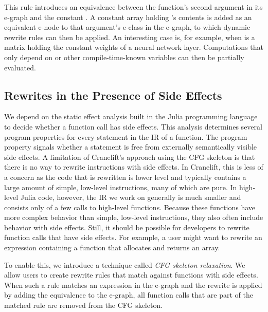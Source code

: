 This rule introduces an equivalence between the function's second argument in its e-graph and the constant . A constant array holding 's contents is added as an equivalent e-node to that argument's e-class in the e-graph, to which dynamic rewrite rules can then be applied. An interesting case is, for example, when  is a matrix holding the constant weights of a neural network layer.
Computations that only depend on  or other compile-time-known variables can then be partially evaluated.


\subsection{Rewrites in the Presence of Side Effects}
We depend on the static effect analysis built in the Julia programming language to decide whether a function call has side effects.
This analysis determines several program properties for every statement in the IR of a function.
The program property  signals whether a statement is free from externally semantically visible side effects.
A limitation of Cranelift's approach using the CFG skeleton is that there is no way to rewrite instructions with side effects.
In Cranelift, this is less of a concern as the code that is rewritten is lower level and typically contains a large amount of simple, low-level instructions, many of which are pure.
In high-level Julia code, however, the IR we work on generally is much smaller and consists only of a few calls to high-level functions.
Because these functions have more complex behavior than simple, low-level instructions, they also often include behavior with side effects. 
Still, it should be possible for developers to rewrite function calls that have side effects.
For example, a user might want to rewrite an expression containing a function that allocates and returns an array.

To enable this, we introduce a technique called \emph{CFG skeleton relaxation}.
We allow users to create rewrite rules that match against functions with side effects.
When such a rule matches an expression in the e-graph and the rewrite is applied by adding the equivalence to the e-graph, all function calls that are part of the matched rule are removed from the CFG skeleton.

